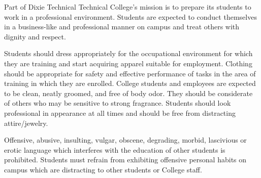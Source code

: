 Part of Dixie Technical Technical College's mission is to prepare its students
to work in a professional environment. Students are expected to conduct
themselves in a business-like and professional manner on campus and treat
others with dignity and respect.
\par
\bigskip
Students should dress appropriately for the occupational environment for
which they are training and start acquiring apparel suitable for employment.
Clothing should be appropriate for safety and effective performance of tasks
in the area of training in which they are enrolled. College students and
employees are expected to be clean, neatly groomed, and free of body odor.
They should be considerate of others who may be sensitive to strong fragrance.
Students should look professional in appearance at all times and should be free
from distracting attire/jewelry.
\par
\bigskip
Offensive, abusive, insulting, vulgar, obscene, degrading, morbid, lascivious
or erotic language which interferes with the education of other students is prohibited.
Students must refrain from exhibiting offensive personal habits on campus which are
distracting to other students or College staff. 
